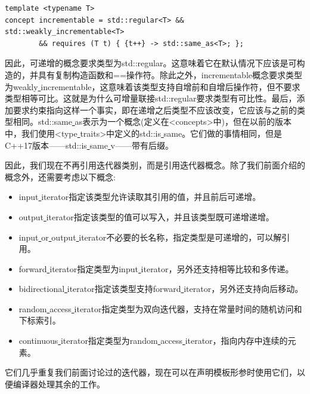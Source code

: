 \begin{lstlisting}[caption={}]
template <typename T>
concept incrementable = std::regular<T> && std::weakly_incrementable<T>
		&& requires (T t) { {t++} -> std::same_as<T>; };
\end{lstlisting}

因此，可递增的概念要求类型为std::regular。这意味着它在默认情况下应该是可构造的，并具有复制构造函数和==操作符。除此之外，incrementable概念要求类型为weakly\underline{ }incrementable，这意味着该类型支持自增前和自增后操作符，但不要求类型相等可比。这就是为什么可增量联接std::regular要求类型有可比性。最后，添加要求约束指向这样一个事实，即在递增之后类型不应该改变，它应该与之前的类型相同。std::same\underline{ }as表示为一个概念(定义在<concepts>中)，但在以前的版本中，我们使用<type\underline{ }traits>中定义的std::is\underline{ }same。它们做的事情相同，但是C++17版本——std::is\underline{ }same\underline{ }v——带有后缀。 \par
因此，我们现在不再引用迭代器类别，而是引用迭代器概念。除了我们前面介绍的概念外，还需要考虑以下概念: \par

\begin{itemize}
	\item input\underline{ }iterator指定该类型允许读取其引用的值，并且前后可递增。
	\item output\underline{ }iterator指定该类型的值可以写入，并且该类型既可递增递增。
	\item input\underline{ }or\underline{ }output\underline{ }iterator不必要的长名称，指定类型是可递增的，可以解引用。
	\item forward\underline{ }iterator指定类型为input\underline{ }iterator，另外还支持相等比较和多传递。
	\item bidirectional\underline{ }iterator指定该类型支持forward\underline{ }iterator，另外还支持向后移动。
	\item random\underline{ }access\underline{ }iterator指定类型为双向迭代器，支持在常量时间的随机访问和下标索引。
	\item continuous\underline{ }iterator指定类型为random\underline{ }access\underline{ }iterator，指向内存中连续的元素。
\end{itemize}

它们几乎重复我们前面讨论过的迭代器，现在可以在声明模板形参时使用它们，以便编译器处理其余的工作。 \par

